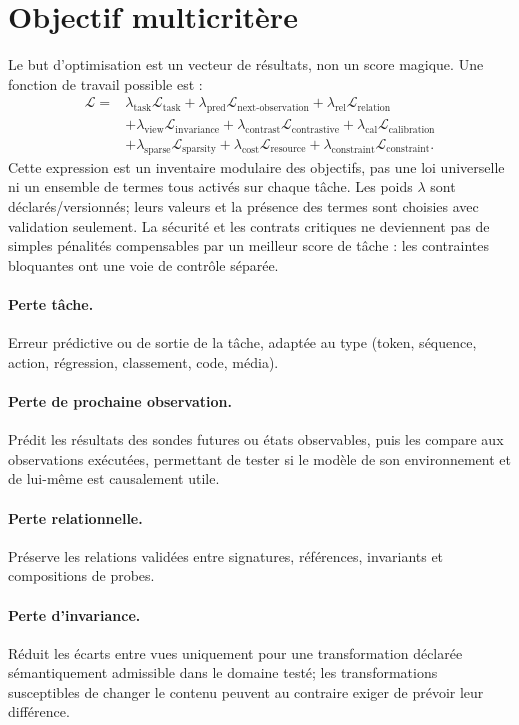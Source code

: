 \documentclass[11pt,a4paper]{report}
\begin{document}
\section{Objectif multicritère}
Le but d'optimisation est un vecteur de résultats, non un score magique. Une fonction de travail possible est :
\[
\begin{split}
\mathcal{L}= {}&\lambda_{\mathrm{task}}\mathcal{L}_{\mathrm{task}}
+\lambda_{\mathrm{pred}}\mathcal{L}_{\mathrm{next\text{-}observation}}
+\lambda_{\mathrm{rel}}\mathcal{L}_{\mathrm{relation}}\\
&+\lambda_{\mathrm{view}}\mathcal{L}_{\mathrm{invariance}}
+\lambda_{\mathrm{contrast}}\mathcal{L}_{\mathrm{contrastive}}
+\lambda_{\mathrm{cal}}\mathcal{L}_{\mathrm{calibration}}\\
&+\lambda_{\mathrm{sparse}}\mathcal{L}_{\mathrm{sparsity}}
+\lambda_{\mathrm{cost}}\mathcal{L}_{\mathrm{resource}}
+\lambda_{\mathrm{constraint}}\mathcal{L}_{\mathrm{constraint}}.
\end{split}
\]
Cette expression est un inventaire modulaire des objectifs, pas une loi universelle ni un ensemble de termes tous activés sur chaque tâche. Les poids $\lambda$ sont déclarés/versionnés; leurs valeurs et la présence des termes sont choisies avec validation seulement. La sécurité et les contrats critiques ne deviennent pas de simples pénalités compensables par un meilleur score de tâche : les contraintes bloquantes ont une voie de contrôle séparée.

\paragraph{Perte tâche.} Erreur prédictive ou de sortie de la tâche, adaptée au type (token, séquence, action, régression, classement, code, média).
\paragraph{Perte de prochaine observation.} Prédit les résultats des sondes futures ou états observables, puis les compare aux observations exécutées, permettant de tester si le modèle de son environnement et de lui-même est causalement utile.
\paragraph{Perte relationnelle.} Préserve les relations validées entre signatures, références, invariants et compositions de probes.
\paragraph{Perte d'invariance.} Réduit les écarts entre vues uniquement pour une transformation déclarée sémantiquement admissible dans le domaine testé; les transformations susceptibles de changer le contenu peuvent au contraire exiger de prévoir leur différence.
\end{document}
